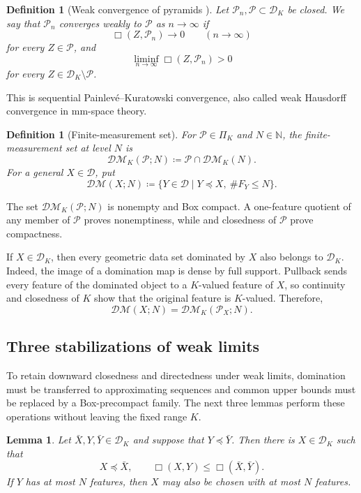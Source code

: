 \documentclass[10pt,a4paper]{amsart}
\newtheorem{lemma}[theorem]{Lemma}
\newtheorem{definition}[theorem]{Definition}
\newcommand{\D}{\mathcal D}
\newcommand{\DK}{\mathcal D_K}
\newcommand{\DM}{\mathcal{DM}}
\begin{document}
\begin{definition}[Weak convergence of pyramids {\cite[Definition~2.11]{gds1}}]
\label{def:weak-convergence}
Let $\mathcal P_n,\mathcal P\subset\DK$ be closed. We say that $\mathcal P_n$ \emph{converges weakly} to $\mathcal P$ as $n\to\infty$ if
\[
\Box(Z,\mathcal P_n)\longrightarrow0\qquad(n\to\infty)
\]
for every $Z\in\mathcal P$, and
\[
\liminf_{n\to\infty}\Box(Z,\mathcal P_n)>0
\]
for every $Z\in\DK\setminus\mathcal P$.
\end{definition}

This is sequential Painlev\'e--Kuratowski convergence, also called weak Hausdorff convergence in mm-space theory.

\begin{definition}[Finite-measurement set]
\label{def:finite-measurements}
For $\mathcal P\in\Pi_K$ and $N\in\mathbb N$, the \emph{finite-measurement set} at level $N$ is
\[
\DM_K(\mathcal P;N)\coloneqq\mathcal P\cap\DM_K(N).
\]
For a general $X\in\D$, put
\[
\DM(X;N)\coloneqq\{Y\in\D\mid Y\preceq X,\ \#F_Y\leq N\}.
\]
\end{definition}

The set $\DM_K(\mathcal P;N)$ is nonempty and Box compact. A one-feature quotient of any member of $\mathcal P$ proves nonemptiness, while  and closedness of $\mathcal P$ prove compactness.

If $X\in\DK$, then every geometric data set dominated by $X$ also belongs to $\DK$. Indeed, the image of a domination map is dense by full support. Pullback sends every feature of the dominated object to a $K$-valued feature of $X$, so continuity and closedness of $K$ show that the original feature is $K$-valued. Therefore,
\[
\DM(X;N)=\DM_K(\mathcal P_X;N).
\]

\subsection{Three stabilizations of weak limits}
\label{subsec:pyramid-weak-limits}

To retain downward closedness and directedness under weak limits, domination must be transferred to approximating sequences and common upper bounds must be replaced by a Box-precompact family. The next three lemmas perform these operations without leaving the fixed range $K$.

\begin{lemma}
\label{lem:K-domination-refinement}
Let $\bar X,Y,\bar Y\in\DK$ and suppose that $Y\preceq\bar Y$. Then there is $X\in\DK$ such that
\[
X\preceq\bar X,\qquad\Box(X,Y)\leq\Box(\bar X,\bar Y).
\]
If $Y$ has at most $N$ features, then $X$ may also be chosen with at most $N$ features.
\end{lemma}
\end{document}
